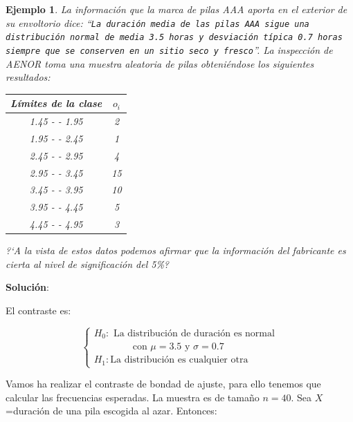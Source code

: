 \documentclass[12pt]{report}
\newtheorem{example}[definition]{Ejemplo}
\begin{document}
          \begin{example}
          La información que la marca de pilas AAA aporta en el
          exterior de su envoltorio dice: ``\texttt{La duración media
          de las pilas
          AAA sigue una distribución normal de media 3.5
          horas y
          desviación típica 0.7 horas siempre que se con\-ser\-ven en un
          sitio seco y fresco}''.
          La inspección de AENOR toma una muestra aleatoria de pilas
          obteniéndose los siguientes resultados:

\begin{center}
      \begin{tabular}{|c|c|}
          \hline
          Límites de la clase &$o_{i}$
          \\
          \hline
      1.45 - -  1.95 &   2 \\
      1.95 - -  2.45 &   1 \\
      2.45 - -  2.95 &   4 \\
      2.95 - -  3.45 &  15 \\
      3.45 - -  3.95 &  10 \\
      3.95 - -  4.45 &   5 \\
      4.45 - -  4.95 &   3 \\
      \hline
          \end{tabular}
\end{center}

          ?`A la vista de estos datos podemos afirmar que la información
          del fabricante es cierta al nivel de significación del 5\%?
          \end{example}

          \textbf{Solución}:

          El contraste es:

          $$\left\{\begin{array}{l}
          H_{0}:\mbox{ La distribución de  duración es normal}\\
          \qquad\qquad\mbox{con }
          \mu=3.5 \mbox{ y }  \sigma=0.7\\
          H_{1}: \mbox{La distribución es  cualquier otra}
          \end{array}
          \right.$$

          Vamos ha realizar el contraste de bondad de ajuste, para ello
          tenemos que calcular las frecuencias esperadas. La
          muestra es de tamaño $n=40$. Sea $X$=duración de una pila
          escogida al azar. Entonces:
\end{document}
